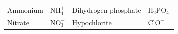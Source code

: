 {{\begin{center}
\begin{xtabular}[t]{|l|l|l|l|}
    
        Ammonium &
    
    
        \begin{math}\mathrm{NH}_{4}^{+}\end{math} &
    
    
        Dihydrogen phosphate &
    
    
        \begin{math}{\mathrm{H}}_{2}\mathrm{PO}_{4}^{-}\end{math}%
     \tabularnewline{}
    
    
        Nitrate &
    
    
        \begin{math}\mathrm{NO}_{3}^{-}\end{math} &
    
    
        Hypochlorite &
    
    
        \begin{math}{\mathrm{ClO}}^{-}\end{math}%
     \tabularnewline{}
    

\end{xtabular}
\end{center}}}
